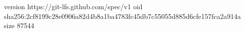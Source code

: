 version https://git-lfs.github.com/spec/v1
oid sha256:2cf8199c28e0906a82d4b8a1ba4783fc45db7c55055d885d6cfe157fca2a914a
size 87544
